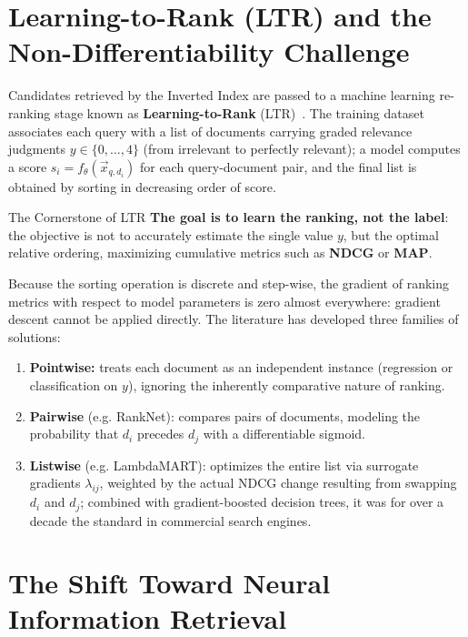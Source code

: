 \FloatBarrier
\section{Learning-to-Rank (LTR) and the Non-Differentiability Challenge}

Candidates retrieved by the Inverted Index are passed to a machine learning re-ranking stage known as \textbf{Learning-to-Rank} (LTR)~\cite{burges2010}. The training dataset associates each query with a list of documents carrying graded relevance judgments $y \in \{0,\dots,4\}$ (from irrelevant to perfectly relevant); a model computes a score $s_i = f_\theta(\vec{x}_{q,d_i})$ for each query-document pair, and the final list is obtained by sorting in decreasing order of score.

\begin{alertblock}{The Cornerstone of LTR}
\textbf{The goal is to learn the ranking, not the label}: the objective is not to accurately estimate the single value $y$, but the optimal relative ordering, maximizing cumulative metrics such as \textbf{NDCG} or \textbf{MAP}.
\end{alertblock}

Because the sorting operation is discrete and step-wise, the gradient of ranking metrics with respect to model parameters is zero almost everywhere: gradient descent cannot be applied directly. The literature has developed three families of solutions:
\begin{enumerate}
    \item \textbf{Pointwise:} treats each document as an independent instance (regression or classification on $y$), ignoring the inherently comparative nature of ranking.
    \item \textbf{Pairwise} (e.g. RankNet): compares pairs of documents, modeling the probability that $d_i$ precedes $d_j$ with a differentiable sigmoid.
    \item \textbf{Listwise} (e.g. LambdaMART): optimizes the entire list via surrogate gradients $\lambda_{ij}$, weighted by the actual NDCG change resulting from swapping $d_i$ and $d_j$; combined with gradient-boosted decision trees, it was for over a decade the standard in commercial search engines.
\end{enumerate}

\FloatBarrier
\section{The Shift Toward Neural Information Retrieval}

